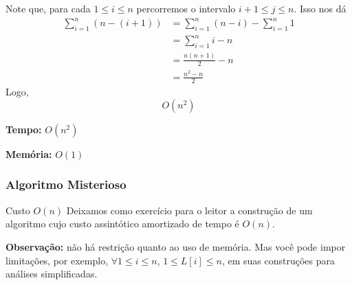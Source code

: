 \documentclass[12pt,openany]{book}
\newcommand{\complexity}[2]{
    \begin{complexitybox}
        \textbf{Tempo:} $O(#1)$ \par
        \textbf{Memória:} $O(#2)$
    \end{complexitybox}
}
\begin{document}
\begin{analysisbox}
    Note que, para cada $1 \leq i \leq n$ percorremos o intervalo $i + 1 \leq j \leq n$.
    Isso nos dá
    \[
        \begin{aligned}
            \sum_{i = 1}^{n} (n - (i + 1)) &= \sum_{i = 1}^{n} (n - i) - \sum_{i = 1}^{n} 1 \\
            &= \sum_{i = 1}^{n} i - n \\
            &= \frac{n(n + 1)}{2} - n \\
            & = \frac{n^2 - n}{2}
        \end{aligned}
    \]
    Logo,
    \[
        O(n^2)
    \]
\end{analysisbox}

\complexity{n^2}{1}

\subsubsection*{Algoritmo Misterioso}
\begin{exercise}{Custo $O(n)$}{}
    Deixamos como exercício para o leitor a construção de um algoritmo cujo custo assintótico amortizado de tempo é $O(n)$.

    \vspace{1em}
    
    \textbf{Observação:} não há restrição quanto ao uso de memória.
    Mas você pode impor limitações, por exemplo, $\forall 1 \leq i \leq n$, $1 \leq L[i] \leq n$, em suas construções para análises simplificadas.
\end{exercise}
\end{document}
